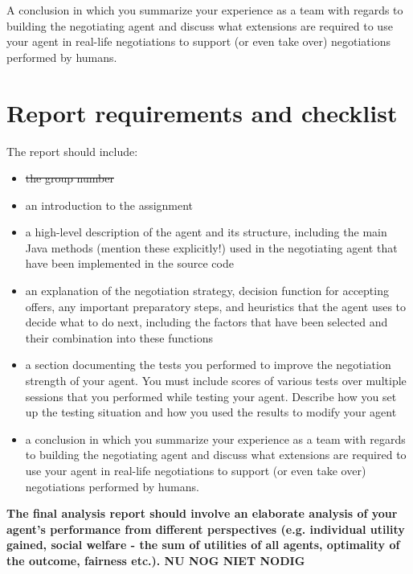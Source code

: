 \documentclass[11pt,a4paper]{report}
\begin{document}
A conclusion in which you summarize your experience as a team with regards to building the
negotiating agent and discuss what extensions are required to use your agent in real-life negotiations to support (or even take over) negotiations performed by humans.

\newpage

\section*{Report requirements and checklist}

The report should include:\\
\begin{itemize}
\item \st{the group number}
\item an introduction to the assignment
\item a high-level description of the agent and its structure, including the main Java methods (mention
these explicitly!) used in the negotiating agent that have been implemented in the source code
\item an explanation of the negotiation strategy, decision function for accepting offers, any important
preparatory steps, and heuristics that the agent uses to decide what to do next, including the factors
that have been selected and their combination into these functions
\item a section documenting the tests you performed to improve the negotiation strength of your agent.
You must include scores of various tests over multiple sessions that you performed while testing
your agent. Describe how you set up the testing situation and how you used the results to modify
your agent
\item a conclusion in which you summarize your experience as a team with regards to building the
negotiating agent and discuss what extensions are required to use your agent in real-life negotiations
to support (or even take over) negotiations performed by humans.
\end{itemize}

\textbf{The final analysis report should involve an elaborate analysis of your agent's performance from different perspectives (e.g. individual utility gained, social welfare - the sum of utilities of all agents, optimality of the outcome, fairness etc.). NU NOG NIET NODIG}
\end{document}
